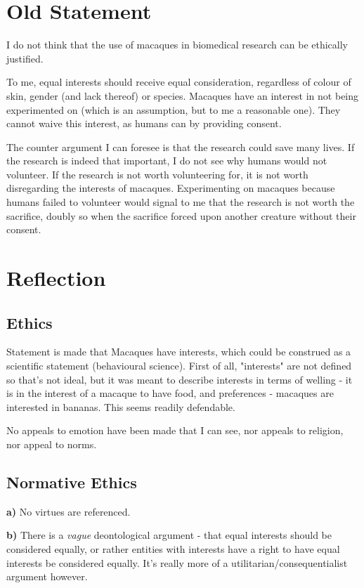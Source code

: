 \documentclass{article}
\begin{document}
	\section{Old Statement}
	
		I do not think that the use of macaques in biomedical research can be ethically justified.
		
		To me, equal interests should receive equal consideration, regardless of colour of skin, gender (and lack thereof) or species. Macaques have an interest in not being experimented on (which is an assumption, but to me a reasonable one). They cannot waive this interest, as humans can by providing consent.
	
		The counter argument I can foresee is that the research could save many
	lives. If the research is indeed that important, I do not see why humans would not volunteer. If the research is not worth volunteering for, it is not worth disregarding the interests of macaques. Experimenting on macaques because humans failed to volunteer would signal to me that the research is not worth the sacrifice, doubly so when the sacrifice forced upon another creature without their consent.

	\section{Reflection}
	
		\subsection{Ethics}
		
			Statement is made that Macaques have interests, which could be construed as a scientific statement (behavioural science). First of all, "interests" are not defined so that's not ideal, but it was meant to describe interests in terms of welling - it is in the interest of a macaque to have food, and preferences - macaques are interested in bananas. This seems readily defendable. 
			
			No appeals to emotion have been made that I can see, nor appeals to religion, nor appeal to norms.
			
		\subsection{Normative Ethics}
		
			\textbf{a)} No virtues are referenced.
			
			\textbf{b) }There is a \textit{vague} deontological argument - that equal interests should be considered equally, or rather entities with interests have a right to have equal interests be considered equally. It's really more of a utilitarian/consequentialist argument however.
			
\end{document}
